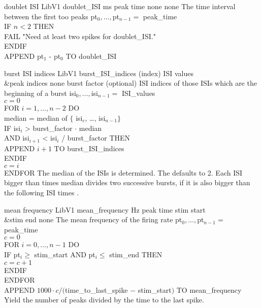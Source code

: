 \begin{efeature}
  {doublet ISI}
  {LibV1}
  {doublet\_ISI}
  {ms}
  {peak time}
  {none}
  {none}
  {The time interval between the first too peaks}
  { 
  pt$_0, \ldots, $pt$_{n-1} =$ peak\_time \\
  IF $n < 2$ THEN \+ \\
    FAIL "Need at least two spikes for doublet\_ISI." \- \\
  ENDIF \\
  APPEND pt$_1$ - pt$_0$ TO doublet\_ISI \\
  }
  
\end{efeature}

\begin{efeature}
  {burst ISI indices}
  {LibV1}
  {burst\_ISI\_indices}
  {(index)}
  {ISI values\\&peak indices}
  {none}
  {burst factor (optional)}
  {ISI indices of those ISIs which are the beginning of a burst}
  {
  isi$_0, \ldots, $isi$_{n-1} =$ ISI\_values \\
  $c = 0$ \\
  FOR $i = 1, \dots, n - 2$ DO \+ \\
    median = median of $\{$ isi$_c$, \ldots, isi$_{n-1}\}$ \\
    IF isi$_i$ > burst\_factor $\cdot$ median \\
    AND isi$_{i+1}$ < isi$_i$ / burst\_factor THEN \+ \\
      APPEND $i+1$ TO burst\_ISI\_indices \- \\
    ENDIF \\
    $c = i$ \- \\
  ENDFOR
  }
  The median of the ISIs is determined.
  The  defaults to 2.
  Each ISI bigger than  times median divides two successive bursts, if it is also bigger than the following ISI times .
  
\end{efeature}

\begin{efeature}
  {mean frequency}
  {LibV1}
  {mean\_frequency}
  {Hz}
  {peak time}
  {stim start\\&stim end}
  {none}
  {The mean frequency of the firing rate}
  {
  pt$_0, \ldots, $pt$_{n-1} =$ peak\_time \\
  $c = 0$ \\
  FOR $i = 0, \dots, n - 1$ DO \+ \\
    IF pt$_i \ge$ stim\_start AND pt$_i \le$ stim\_end THEN \+ \\
      $c = c + 1$ \- \\
    ENDIF \- \\
  ENDFOR \\
  APPEND $1000 \cdot c / ($time\_to\_last\_spike $-$ stim\_start$)$ TO mean\_frequency
  }
  Yield the number of peaks divided by the time to the last spike.
\end{efeature}

